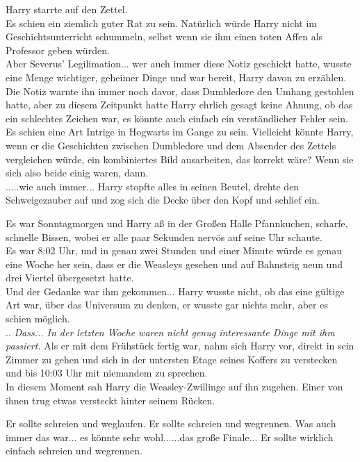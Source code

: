 {Harry starrte auf den Zettel.\\ Es schien ein ziemlich guter Rat zu sein. Natürlich würde Harry nicht im Geschichtsunterricht schummeln, selbst wenn sie ihm einen toten Affen als Professor geben würden.\\ Aber Severus' Legilimation... wer auch immer diese Notiz geschickt hatte, wusste eine Menge wichtiger, geheimer Dinge und war bereit, Harry davon zu erzählen.\\ Die Notiz warnte ihn immer noch davor, dass Dumbledore den Umhang gestohlen hatte, aber zu diesem Zeitpunkt hatte Harry ehrlich gesagt keine Ahnung, ob das ein schlechtes Zeichen war, es könnte auch einfach ein verständlicher Fehler sein.\\ Es schien eine Art Intrige in Hogwarts im Gange zu sein. Vielleicht könnte Harry, wenn er die Geschichten zwischen Dumbledore und dem Absender des Zettels vergleichen würde, ein kombiniertes Bild ausarbeiten, das korrekt wäre? Wenn sie sich also beide einig waren, dann.\\ .....wie auch immer... Harry stopfte alles in seinen Beutel, drehte den Schweigezauber auf und zog sich die Decke über den Kopf und schlief ein.

Es war Sonntagmorgen und Harry aß in der Großen Halle Pfannkuchen, scharfe, schnelle Bissen, wobei er alle paar Sekunden nervös auf seine Uhr schaute.\\ Es war 8:02 Uhr, und in genau zwei Stunden und einer Minute würde es genau eine Woche her sein, dass er die Weasleys gesehen und auf Bahnsteig neun und drei Viertel übergesetzt hatte.\\ Und der Gedanke war ihm gekommen... Harry wusste nicht, ob das eine gültige Art war, über das Universum zu denken, er wusste gar nichts mehr, aber es schien möglich.\\ .. \emph{Dass... In der letzten Woche waren nicht genug interessante Dinge mit ihm passiert.} Als er mit dem Frühstück fertig war, nahm sich Harry vor, direkt in sein Zimmer zu gehen und sich in der untersten Etage seines Koffers zu verstecken und bis 10:03 Uhr mit niemandem zu sprechen.\\ In diesem Moment sah Harry die Weasley-Zwillinge auf ihn zugehen. Einer von ihnen trug etwas versteckt hinter seinem Rücken.

Er sollte schreien und weglaufen. Er sollte schreien und wegrennen. Was auch immer das war... es könnte sehr wohl......das große Finale... Er sollte wirklich einfach schreien und wegrennen.

}
